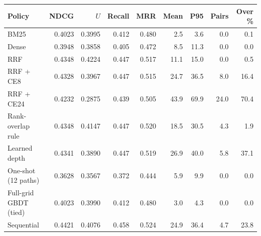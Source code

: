 \begin{tabular}{lrrrrrrrr}
\toprule
Policy & NDCG & $U$ & Recall & MRR & Mean & P95 & Pairs & Over \% \\
\midrule
BM25 & 0.4023 & 0.3995 & 0.412 & 0.480 & 2.5 & 3.6 & 0.0 & 0.1 \\
Dense & 0.3948 & 0.3858 & 0.405 & 0.472 & 8.5 & 11.3 & 0.0 & 0.0 \\
RRF & 0.4348 & 0.4224 & 0.447 & 0.517 & 11.1 & 15.0 & 0.0 & 0.5 \\
RRF + CE8 & 0.4328 & 0.3967 & 0.447 & 0.515 & 24.7 & 36.5 & 8.0 & 16.4 \\
RRF + CE24 & 0.4232 & 0.2875 & 0.439 & 0.505 & 43.9 & 69.9 & 24.0 & 70.4 \\
Rank-overlap rule & 0.4348 & 0.4147 & 0.447 & 0.520 & 18.5 & 30.5 & 4.3 & 1.9 \\
Learned depth & 0.4341 & 0.3890 & 0.447 & 0.519 & 26.9 & 40.0 & 5.8 & 37.1 \\
One-shot (12 paths) & 0.3628 & 0.3567 & 0.372 & 0.444 & 5.9 & 9.9 & 0.0 & 0.0 \\
Full-grid GBDT (tied) & 0.4023 & 0.3990 & 0.412 & 0.480 & 3.0 & 4.3 & 0.0 & 0.0 \\
Sequential & 0.4421 & 0.4076 & 0.458 & 0.524 & 24.9 & 36.4 & 4.7 & 23.8 \\
\bottomrule
\end{tabular}
